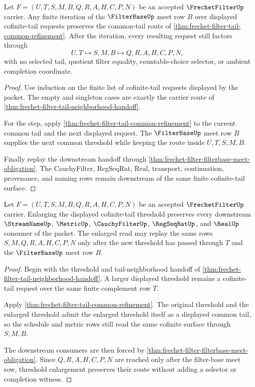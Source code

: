 \begin{theorem}
\label{thm:frechet-filter-tail-closure-induction}
Let $F=(U,T,S,M,B,Q,R,A,H,C,P,N)$ be an accepted $\FrechetFilterUp$ carrier. Any finite iteration of the $\FilterBaseUp$ meet row $B$ over displayed cofinite-tail requests preserves the common-tail route of \autoref{thm:frechet-filter-tail-common-refinement}. After the iteration, every resulting request still factors through
$$
U,T \longmapsto S,M,B \longmapsto Q,R,A,H,C,P,N ,
$$
with no selected tail, quotient filter equality, countable-choice selector, or ambient completion coordinate.
\end{theorem}
\begin{proof}
Use induction on the finite list of cofinite-tail requests displayed by the packet. The empty and singleton cases are exactly the carrier route of \autoref{thm:frechet-filter-tail-neighborhood-handoff}.

For the step, apply \autoref{thm:frechet-filter-tail-common-refinement} to the current common tail and the next displayed request. The $\FilterBaseUp$ meet row $B$ supplies the next common threshold while keeping the route inside $U,T,S,M,B$.

Finally replay the downstream handoff through \autoref{thm:frechet-filter-filterbase-meet-obligation}. The CauchyFilter, RegSeqRat, Real, transport, continuation, provenance, and naming rows remain downstream of the same finite cofinite-tail surface.
\end{proof}

\begin{theorem}
\label{thm:frechet-filter-threshold-monotonicity}
Let $F=(U,T,S,M,B,Q,R,A,H,C,P,N)$ be an accepted $\FrechetFilterUp$ carrier. Enlarging the displayed cofinite-tail threshold preserves every downstream $\StreamNameUp$, $\MetricUp$, $\CauchyFilterUp$, $\RegSeqRatUp$, and $\RealUp$ consumer of the packet. The enlarged read may replay the same rows $S,M,Q,R,A,H,C,P,N$ only after the new threshold has passed through $T$ and the $\FilterBaseUp$ meet row $B$.
\end{theorem}
\begin{proof}
Begin with the threshold and tail-neighborhood handoff of \autoref{thm:frechet-filter-tail-neighborhood-handoff}. A larger displayed threshold remains a cofinite-tail request over the same finite complement row $T$.

Apply \autoref{thm:frechet-filter-tail-common-refinement}. The original threshold and the enlarged threshold admit the enlarged threshold itself as a displayed common tail, so the schedule and metric rows still read the same cofinite surface through $S,M,B$.

The downstream consumers are then forced by \autoref{thm:frechet-filter-filterbase-meet-obligation}. Since $Q,R,A,H,C,P,N$ are reached only after the filter-base meet row, threshold enlargement preserves their route without adding a selector or completion witness.
\end{proof}

